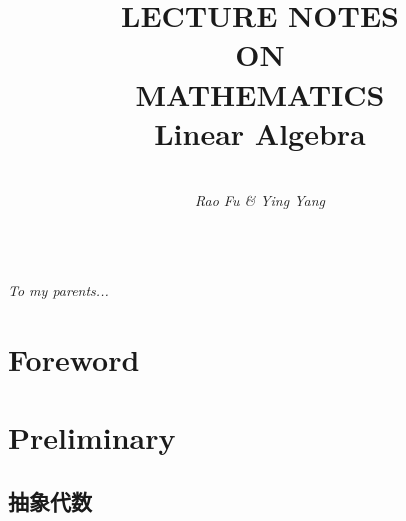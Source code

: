 \documentclass[twoside,openright]{book}
\begin{document}
\begin{CJK*}{UTF8}{}
\CJKtilde
{}

\renewcommand{\bibname}{参考文献}

\frontmatter

\title{\Huge{\textbf{LECTURE NOTES}} \\ \Huge{\textbf{ON}} \\ \Huge{\textbf{MATHEMATICS}} \\[1em] Linear Algebra}
\author{\\[2em]\textit{Rao Fu \& Ying Yang}}
\date{}

\maketitle

\newpage
$ $

\newpage

\begin{minipage}[c][16cm][c]{11.5cm}
\centerline{\textit{To my parents...}}
\end{minipage}

\chapter*{Foreword}


\mainmatter

\chapter{Preliminary}

\section{抽象代数}


\end{CJK*}
\end{document}
